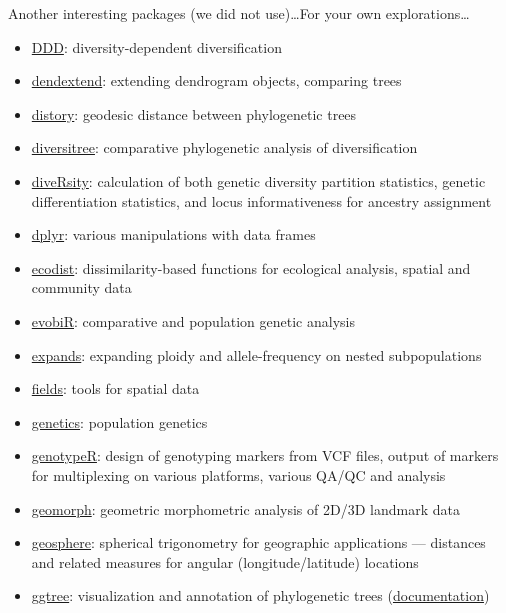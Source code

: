 \documentclass[compress, ucs, xelatex, 11pt, xcolor=svgnames, aspectratio=169,
	hyperref={
		bookmarks=true,
		unicode=true,
		colorlinks=true,
		pdftitle={Molecular data in R},
		plainpages=false,
		pdfauthor={Vojtech Zeisek},
		pdfsubject={Course about phylogeny and evolution in R},
		pdfcreator={XeLaTeX},
		pdfkeywords={R, evolution, phylogeny, molecular data},
		linkcolor=Crimson, %
		anchorcolor=Magenta, %
		citecolor=Magenta, %
		filecolor=Magenta, %
		menucolor=Magenta, %
		urlcolor=DodgerBlue, %
		pdftex},
	url={hyphens, lowtilde} %
	]{beamer}
\begin{document}
\begin{frame}[allowframebreaks]{Another interesting packages (we did not use)\ldots}{For your own explorations\ldots}
\begin{itemize}
		\item \href{https://CRAN.R-project.org/package=DDD}{DDD}: diversity-dependent diversification
		\item \href{https://CRAN.R-project.org/package=dendextend}{dendextend}: extending dendrogram objects, comparing trees
		\item \href{https://CRAN.R-project.org/package=distory}{distory}: geodesic distance between phylogenetic trees
		\item \href{https://CRAN.R-project.org/package=diversitree}{diversitree}: comparative phylogenetic analysis of diversification
		\item \href{https://CRAN.R-project.org/package=diveRsity}{diveRsity}: calculation of both genetic diversity partition statistics, genetic differentiation statistics, and locus informativeness for ancestry assignment
		\item \href{https://CRAN.R-project.org/package=dplyr}{dplyr}: various manipulations with data frames
		\item \href{https://CRAN.R-project.org/package=ecodist}{ecodist}: dissimilarity-based functions for ecological analysis, spatial and community data
		\item \href{https://CRAN.R-project.org/package=evobiR}{evobiR}: comparative and population genetic analysis
		\item \href{https://CRAN.R-project.org/package=expands}{expands}: expanding ploidy and allele-frequency on nested subpopulations
		\item \href{https://CRAN.R-project.org/package=fields}{fields}: tools for spatial data
		\item \href{https://CRAN.R-project.org/package=genetics}{genetics}: population genetics
		\item \href{https://CRAN.R-project.org/package=genotypeR}{genotypeR}: design of genotyping markers from VCF files, output of markers for multiplexing on various platforms, various QA/QC and analysis
		\item \href{https://CRAN.R-project.org/package=geomorph}{geomorph}: geometric morphometric analysis of 2D/3D landmark data
		\item \href{https://CRAN.R-project.org/package=geosphere}{geosphere}: spherical trigonometry for geographic applications --- distances and related measures for angular (longitude/latitude) locations
		\item \href{https://bioconductor.org/packages/release/bioc/html/ggtree.html}{ggtree}: visualization and annotation of phylogenetic trees (\href{https://guangchuangyu.github.io/software/ggtree/documentation/}{documentation})

\end{itemize}
\end{frame}
\end{document}
